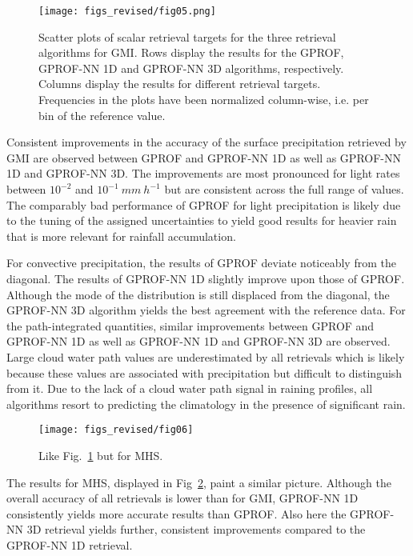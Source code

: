\documentclass[journal abbreviation, manuscript]{copernicus}
\begin{document}
\begin{figure}[hbpt]
  \centering
  \texttt{[image: figs\_revised/fig05.png]}
  \caption{
    Scatter plots of scalar retrieval targets for the three retrieval algorithms
    for GMI. Rows display the results for the GPROF, GPROF-NN 1D and GPROF-NN
    3D algorithms, respectively. Columns display the results for different
    retrieval targets. Frequencies in the plots have been normalized
    column-wise, i.e. per bin of the reference value.
  }
  \label{fig:results_scatter_gmi}
\end{figure}

Consistent improvements in the accuracy of the surface precipitation retrieved
by GMI are observed between GPROF and GPROF-NN 1D as well as GPROF-NN 1D and
GPROF-NN 3D. The improvements are most pronounced for light rates between
$10^{-2}$ and $10^{-1}\ \unit{mm\ h^{-1}}$ but are consistent across the full
range of values. The comparably bad performance of GPROF for light precipitation
is likely due to the tuning of the assigned uncertainties to yield good results
for heavier rain that is more relevant for rainfall accumulation.

For convective precipitation, the results of GPROF deviate noticeably from the
diagonal. The results of GPROF-NN 1D slightly improve upon those  of GPROF. Although
the mode of the distribution is still displaced from the diagonal, the GPROF-NN
3D algorithm yields the best agreement with the reference data. For the
path-integrated quantities, similar improvements between GPROF and GPROF-NN 1D
as well as GPROF-NN 1D and GPROF-NN 3D are observed. Large cloud water path
values are underestimated by all retrievals which is likely because these values
are associated with precipitation but difficult to distinguish from it. Due to
the lack of a cloud water path signal in raining profiles, all algorithms resort
to predicting the climatology in the presence of significant rain.


\begin{figure}[hbpt]
  \centering
  \texttt{[image: figs\_revised/fig06]}
  \caption{
    Like Fig.~\ref{fig:results_scatter_gmi} but for MHS.
  }
  \label{fig:results_scatter_mhs}
\end{figure}

The results for MHS, displayed in Fig~\ref{fig:results_scatter_mhs}, paint a
similar picture. Although the overall accuracy of all retrievals is lower than
for GMI, GPROF-NN 1D consistently yields more accurate results than GPROF. Also
here the GPROF-NN 3D retrieval yields further, consistent improvements compared
to the GPROF-NN 1D retrieval.
\end{document}
